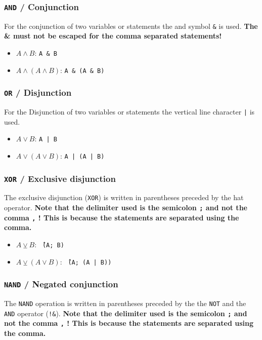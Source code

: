 \documentclass[a4paper]{article}
\begin{document}
\subsubsection{\texttt{AND} / Conjunction}

For the conjunction of two variables or statements the and symbol \texttt{\&} is used. \textbf{The \& must not be escaped for the comma separated statements!}
\begin{itemize}
	\item $A \land B$:  \texttt{A \& B}
	\item $A \land (A \land B)$: \texttt{A \& (A \& B)}
\end{itemize}

\subsubsection{\texttt{OR} / Disjunction}

For the Disjunction of two variables or statements the vertical line character \texttt{|} is used.

\begin{itemize}
	\item $A \lor B$:  \texttt{A | B}
	\item $A \lor (A \lor B)$: \texttt{A | (A | B)}
\end{itemize}

\subsubsection{\texttt{XOR} /  Exclusive disjunction}

The exclusive disjunction (\texttt{XOR}) is written in parentheses preceded by the hat operator. \textbf{Note that the delimiter used is the semicolon \texttt{;} and not the comma \texttt{,} ! This is because the statements are separated using the comma.}

\begin{itemize}
	\item $A \veebar B$:  \texttt{\^\ (A; B)}
	\item $A \veebar (A \lor B)$: \texttt{\^\ (A; (A | B))}
\end{itemize}

\subsubsection{\texttt{NAND} / Negated conjunction}

The \texttt{NAND} operation is written in parentheses preceded by the the \texttt{NOT} and the \texttt{AND} operator (\texttt{!\&}). \textbf{Note that the delimiter used is the semicolon \texttt{;} and not the comma \texttt{,} ! This is because the statements are separated using the comma.}
\end{document}
